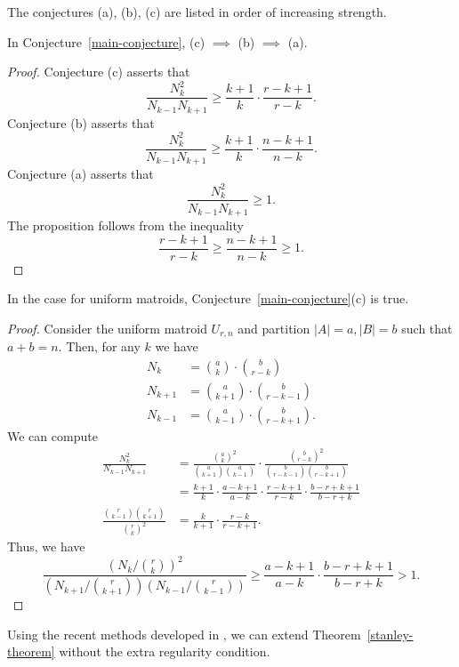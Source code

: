 \documentclass[12pt]{article}
\begin{document}
The conjectures (a), (b), (c) are listed in order of increasing strength. 

\begin{prop}
	In Conjecture~\ref{main-conjecture}, (c) $\implies$ (b) $\implies$ (a). 
\end{prop}

\begin{proof}
	Conjecture (c) asserts that 
	\[
		\frac{N_k^2}{N_{k-1}N_{k+1}} \geq \frac{k+1}{k} \cdot \frac{r-k+1}{r-k}.
	\]
	Conjecture (b) asserts that
	\[
		\frac{N_k^2}{N_{k-1}N_{k+1}} \geq \frac{k+1}{k} \cdot \frac{n-k+1}{n-k}.
	\]
	Conjecture (a) asserts that 
	\[
		\frac{N_k^2}{N_{k-1}N_{k+1}} \geq 1. 
	\]
	The proposition follows from the inequality 
	\[
		\frac{r-k+1}{r-k} \geq \frac{n-k+1}{n-k} \geq 1.
	\]
\end{proof}

\begin{prop}
	In the case for uniform matroids, Conjecture~\ref{main-conjecture}(c) is true. 
\end{prop}

\begin{proof}
	Consider the uniform matroid $U_{r, n}$ and partition $|A| = a, |B| = b$ such that $a + b = n$. Then, for any $k$ we have
	\begin{align*}
		N_k & = \binom{a}{k} \cdot \binom{b}{r-k} \\
		N_{k+1} & = \binom{a}{k+1} \cdot \binom{b}{r-k-1} \\
		N_{k-1} & = \binom{a}{k-1} \cdot \binom{b}{r-k+1}.
	\end{align*}
	We can compute
	\begin{align*}
		\frac{N_k^2}{N_{k-1} N_{k+1}} & = \frac{\binom{a}{k}^2}{\binom{a}{k+1} \binom{a}{k-1}} \cdot \frac{\binom{b}{r-k}^2}{\binom{b}{r-k-1} \binom{b}{r-k+1}} \\
		& = \frac{k+1}{k} \cdot \frac{a-k+1}{a-k} \cdot \frac{r-k+1}{r-k} \cdot \frac{b-r+k+1}{b-r+k} \\
		\frac{\binom{r}{k-1} \binom{r}{k+1}}{\binom{r}{k}^2} & = \frac{k}{k+1} \cdot \frac{r-k}{r-k+1}.
	\end{align*}
	Thus, we have
	\[
		\frac{(N_k / \binom{r}{k})^2}{(N_{k+1} / \binom{r}{k+1}) (N_{k-1} / \binom{r}{k-1})} \geq \frac{a-k+1}{a-k} \cdot \frac{b-r+k+1}{b-r+k} > 1. 
	\]
\end{proof}

Using the recent methods developed in \cite{lorentzian-polynomials}, we can extend Theorem~\ref{stanley-theorem} without the extra regularity condition. 
\end{document}
